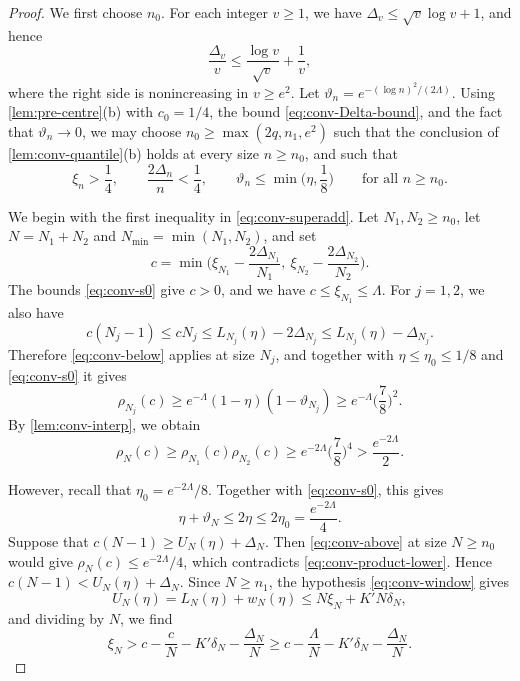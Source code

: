 \begin{proof}
We first choose $n_0$. For each integer $v \ge 1$, we have $\Delta_v \le \sqrt v\log v + 1$, and hence
\begin{equation}\label{eq:conv-Delta-bound}
\frac{\Delta_v}{v} \le \frac{\log v}{\sqrt v} + \frac 1v,
\end{equation}
where the right side is nonincreasing in $v \ge e^2$. Let $\vartheta_n = e^{-(\log n)^2/(2\Lambda)}$. Using \cref{lem:pre-centre}(b) with $c_0 = 1/4$, the bound \eqref{eq:conv-Delta-bound}, and the fact that $\vartheta_n \to 0$, we may choose $n_0 \ge \max(2q, n_1, e^2)$ such that the conclusion of \cref{lem:conv-quantile}(b) holds at every size $n \ge n_0$, and such that
\begin{equation}\label{eq:conv-s0}
\xi_n > \frac 14, \qquad \frac{2\Delta_n}{n} < \frac 14, \qquad \vartheta_n \le \min\Big(\eta, \frac 18\Big) \qquad \text{for all } n \ge n_0.
\end{equation}

We begin with the first inequality in \eqref{eq:conv-superadd}. Let $N_1, N_2 \ge n_0$, let $N = N_1 + N_2$ and $N_{\min} = \min(N_1, N_2)$, and set
\[
c = \min\Big(\xi_{N_1} - \frac{2\Delta_{N_1}}{N_1}, \ \xi_{N_2} - \frac{2\Delta_{N_2}}{N_2}\Big).
\]
The bounds \eqref{eq:conv-s0} give $c > 0$, and we have $c \le \xi_{N_1} \le \Lambda$. For $j = 1, 2$, we also have
\[
c (N_j - 1) \le c N_j \le L_{N_j}(\eta) - 2\Delta_{N_j} \le L_{N_j}(\eta) - \Delta_{N_j}.
\]
Therefore \eqref{eq:conv-below} applies at size $N_j$, and together with $\eta \le \eta_0 \le 1/8$ and \eqref{eq:conv-s0} it gives
\[
\rho_{N_j}(c) \ge e^{-\Lambda} (1 - \eta)(1 - \vartheta_{N_j}) \ge e^{-\Lambda} \Big(\frac 78\Big)^2.
\]
By \cref{lem:conv-interp}, we obtain
\begin{equation}\label{eq:conv-product-lower}
\rho_N(c) \ge \rho_{N_1}(c) \rho_{N_2}(c) \ge e^{-2\Lambda} \Big(\frac 78\Big)^4 > \frac{e^{-2\Lambda}}{2}.
\end{equation}

However, recall that $\eta_0 = e^{-2\Lambda}/8$. Together with \eqref{eq:conv-s0}, this gives
\[
\eta + \vartheta_N \le 2\eta \le 2\eta_0 = \frac{e^{-2\Lambda}}{4}.
\]
Suppose that $c(N - 1) \ge U_N(\eta) + \Delta_N$. Then \eqref{eq:conv-above} at size $N \ge n_0$ would give $\rho_N(c) \le e^{-2\Lambda}/4$, which contradicts \eqref{eq:conv-product-lower}. Hence $c(N - 1) < U_N(\eta) + \Delta_N$. Since $N \ge n_1$, the hypothesis \eqref{eq:conv-window} gives
\[
U_N(\eta) = L_N(\eta) + w_N(\eta) \le N \xi_N + K' N \delta_N,
\]
and dividing by $N$, we find
\begin{equation}\label{eq:conv-xiN}
\xi_N > c - \frac cN - K' \delta_N - \frac{\Delta_N}{N} \ge c - \frac{\Lambda}{N} - K' \delta_N - \frac{\Delta_N}{N}.
\end{equation}


\end{proof}

